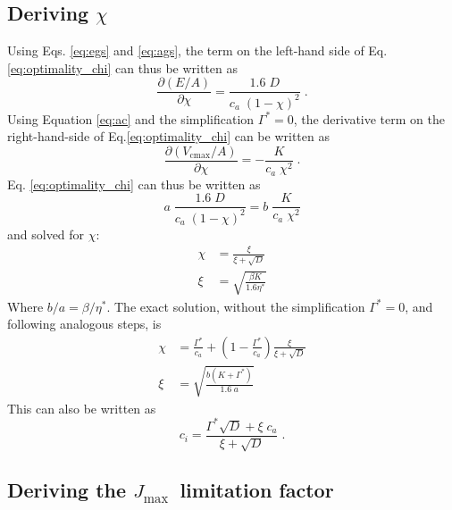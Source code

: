 \documentclass[gmd, manuscript]{copernicus}
\newcommand{\jmax}{$J_{\text{max}}$}
\begin{document}
\subsection{Deriving $\chi$}
\label{sec:steps_chi}

Using Eqs. \ref{eq:egs} and \ref{eq:ags}, the term on the left-hand side of Eq. \ref{eq:optimality_chi} can thus be written as
\begin{equation}
\label{eq:partial1}
    \frac{\partial (E/A)}{\partial \chi} = \frac{1.6\;D}{c_a\;(1-\chi)^2}\;.
\end{equation}
Using Equation \ref{eq:ac} and the simplification $\Gamma^{\ast}=0$, the derivative term on the right-hand-side of Eq.\ref{eq:optimality_chi} can be written as
\begin{equation}
\label{eq:partial2}
    \frac{\partial (V_{\mathrm{cmax}}/A)}{\partial \chi} = - \frac{K}{c_a\;\chi^2}\;.
\end{equation}
Eq. \ref{eq:optimality_chi} can thus be written as
\begin{equation}
    a\;\frac{1.6\;D}{c_a\;(1-\chi)^2} = b\;\frac{K}{c_a\;\chi^2}
\end{equation}
and solved for $\chi$:
\begin{align}
    \chi &= \frac{\xi}{\xi + \sqrt{D}} \\ 
    \xi &= \sqrt{\frac{\beta K}{1.6 \eta^\ast}}
\end{align}
Where $b/a=\beta/\eta^\ast$. The exact solution, without the simplification $\Gamma^{\ast}=0$, and following analogous steps, is 
\begin{align}
\label{eq:chi_exact}
    \chi &= \frac{\Gamma^{\ast}}{c_a} + \left(1- \frac{\Gamma^{\ast}}{c_a}\right)\frac{\xi}{\xi + \sqrt{D}}\\
    \xi &= \sqrt{\frac{b(K+\Gamma^{\ast})}{1.6\;a}}
\end{align}
This can also be written as
\begin{equation}
\label{eq:ci}
    c_i = \frac{\Gamma^{\ast}\sqrt{D}+ \xi\;c_a}{\xi + \sqrt{D}} \;. 
\end{equation}

\subsection{Deriving the \jmax\ limitation factor}
\label{sec:steps_jmaxlim}
\end{document}
